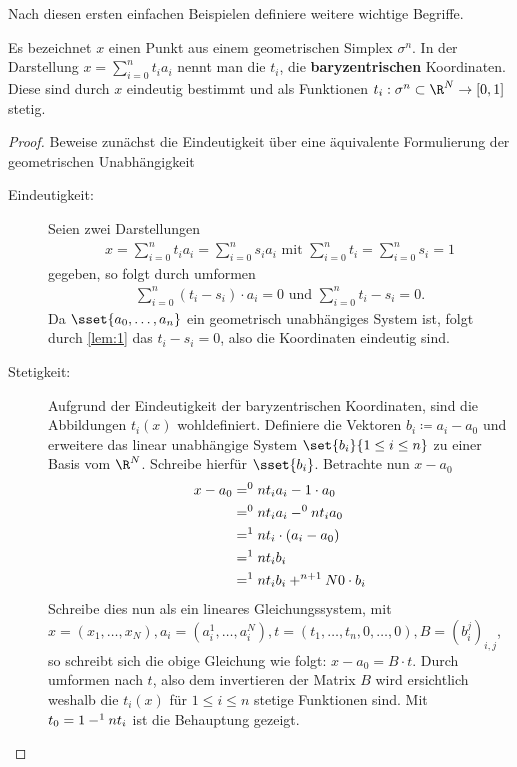 
Nach diesen ersten einfachen Beispielen definiere weitere wichtige
Begriffe.

\begin{Lem}
  \normalfont Es bezeichnet $x$ einen Punkt aus einem geometrischen Simplex
  $\sigma^n$. In der Darstellung $x = \sum\limits_{i=0}^n t_i a_i$ nennt
  man die $t_i$, die \textbf{baryzentrischen} Koordinaten. Diese sind durch $x$
  eindeutig bestimmt und als Funktionen $t_i : \sigma^n \subset \R^N \rightarrow [0,1]$ stetig.
  \begin{proof}
  	Beweise zunächst die Eindeutigkeit über eine äquivalente Formulierung der
  	geometrischen Unabhängigkeit 
  	\begin{description}
  		\item[Eindeutigkeit: ] Seien zwei Darstellungen 
	  		\begin{gather*}
	  		x = \sum\limits_{i=0}^n t_i a_i = \sum\limits_{i=0}^n s_i a_i \text{ mit }
	  		\sum\limits_{i=0}^n t_i = \sum\limits_{i=0}^n s_i = 1
	  		\end{gather*}
		  	gegeben, so folgt durch umformen
		  	\begin{gather*}
		  		\sum\limits_{i=0}^n (t_i - s_i ) \cdot a_i = 0 \text{ und }
		  		\sum\limits_{i=0}^n t_i - s_i = 0.
		  	\end{gather*}
		  	Da $\sset{a_0 , \ldots , a_n}$ ein geometrisch unabhängiges System ist, folgt durch \cref{lem:1} das $t_i - s_i = 0$,
		  	also die Koordinaten eindeutig sind.
  		\item[Stetigkeit: ] Aufgrund der Eindeutigkeit der baryzentrischen
	  		Koordinaten, sind die Abbildungen $t_i (x)$ wohldefiniert.
		  	Definiere die Vektoren $b_i \coloneqq a_i - a_0$ und
		  	erweitere das linear unabhängige System $\set{ b_i }{ 1 \leq i \leq n}$ zu einer Basis	vom $\R^N$. Schreibe hierfür $\sset{ b_i }$.	Betrachte nun $x - a_0$
		  	\begin{align*}
		  		x - a_0 &= \sp{0}{n} t_i a_i - 1 \cdot a_0\\
				  		&= \sp{0}{n} t_i a_i - \sp{0}{n} t_i a_0\\
				  		&= \sp{1}{n} t_i \cdot (a_i - a_0)\\
				  		&= \sp{1}{n} t_i b_i\\
				  		&= \sp{1}{n} t_i b_i + \sp{n+1}{N} 0 \cdot b_i
		  	\end{align*}
		  	Schreibe dies nun als ein lineares Gleichungssystem, mit
		  	$x=(x_1,\ldots,x_N),a_i=(a_i^1,\ldots,a_i^N),t=(t_1,\ldots,t_n,0,\ldots,0),B=(b_i^j)_{i,j}$,
		  	so schreibt sich die obige Gleichung wie folgt: $x-a_0 = B\cdot t$. Durch umformen nach $t$, also dem invertieren der Matrix $B$ 
		  	wird ersichtlich weshalb die $t_i(x)$ für $1 \leq i \leq n$
		  	stetige Funktionen sind. Mit $t_0 = 1 - \sp{1}{n} t_i$ ist die
		  	Behauptung gezeigt.
  	\end{description}
  \end{proof}
	

\end{Lem}
